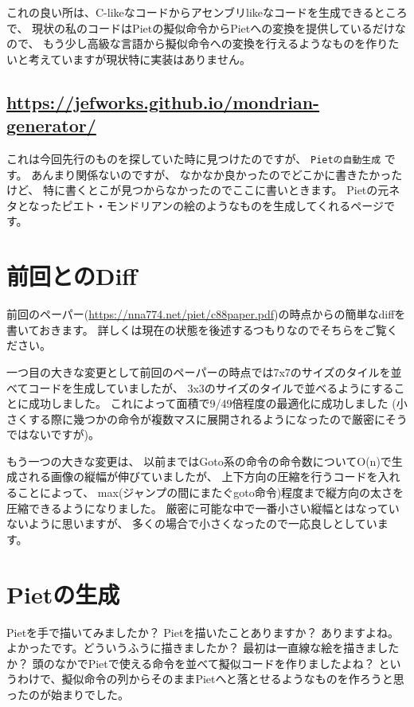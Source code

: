 これの良い所は、C-likeなコードからアセンブリlikeなコードを生成できるところで、
現状の私のコードはPietの擬似命令からPietへの変換を提供しているだけなので、
もう少し高級な言語から擬似命令への変換を行えるようなものを作りたいと考えていますが現状特に実装はありません。

\subsection{\texorpdfstring{\url{https://jefworks.github.io/mondrian-generator/}}{https://jefworks.github.io/mondrian-generator/}}

これは今回先行のものを探していた時に見つけたのですが、
\texttt{Pietの自動生成} です。 あんまり関係ないのですが、
なかなか良かったのでどこかに書きたかったけど、
特に書くとこが見つからなかったのでここに書いときます。
Pietの元ネタとなったピエト・モンドリアンの絵のようなものを生成してくれるページです。

\section{前回とのDiff}

前回のペーパー(\url{https://nna774.net/piet/c88paper.pdf})の時点からの簡単なdiffを書いておきます。
詳しくは現在の状態を後述するつもりなのでそちらをご覧ください。

一つ目の大きな変更として前回のペーパーの時点では7x7のサイズのタイルを並べてコードを生成していましたが、
3x3のサイズのタイルで並べるようにすることに成功しました。
これによって面積で9/49倍程度の最適化に成功しました
(小さくする際に幾つかの命令が複数マスに展開されるようになったので厳密にそうではないですが)。

もう一つの大きな変更は、
以前まではGoto系の命令の命令数についてO(n)で生成される画像の縦幅が伸びていましたが、
上下方向の圧縮を行うコードを入れることによって、
max(ジャンプの間にまたぐgoto命令)程度まで縦方向の太さを圧縮できるようになりました。
厳密に可能な中で一番小さい縦幅とはなっていないように思いますが、
多くの場合で小さくなったので一応良しとしています。

\section{Pietの生成}

Pietを手で描いてみましたか？ Pietを描いたことありますか？ ありますよね。
よかったです。どういうふうに描きましたか？
最初は一直線な絵を描きましたか？
頭のなかでPietで使える命令を並べて擬似コードを作りましたよね？
というわけで、擬似命令の列からそのままPietへと落とせるようなものを作ろうと思ったのが始まりでした。

